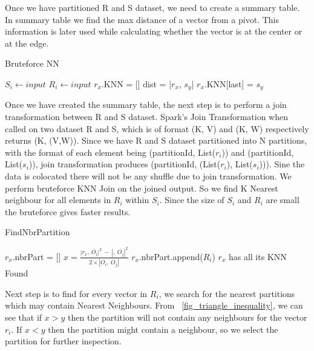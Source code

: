 Once we have partitioned R and S dataset, we need to create a summary
table. In summary table we find the max distance of a vector from a
pivot. This information is later used while calculating whether the
vector is at the center or at the edge.

\begin{algorithm}
  \caption{Bruteforce NN}
  \label{algo_bruteforce_nn}
  \begin{algorithmic}[1]
    \STATE $S_i \leftarrow input$
    \STATE $R_i \leftarrow input$
    \STATE $r_x$.KNN = []
    \STATE dist = |$r_x$, $s_y$|
    \STATE $r_x$.KNN[last] = $s_y$
    \ENDIF
    \ENDFOR
    \ENDFOR
  \end{algorithmic}
\end{algorithm}


Once we have created the summary table, the next step is to perform a join transformation between R
and S dataset. Spark's Join Transformation when called on two dataset R and S,
which is of format (K, V) and (K, W) respectively returns (K,
(V,W)). Since we have R and S dataset partitioned into N partitions,
with the format of each element being (partitionId, List($r_i$)) and
(partitionId, List($s_i$)), join transformation produces (partitionId,
(List($r_i$), List($s_i$))). Sine the data is colocated there will not
be any shuffle due to join transformation. We perform bruteforce KNN
Join on the joined output. So we find K Nearest neighbour for all
elements in $R_i$ within $S_i$. Since the size of $S_i$ and $R_i$ are
small the bruteforce gives faster results.

\begin{algorithm}
  \caption{FindNbrPartition}
  \label{algo_nbr_partition}
  \begin{algorithmic}[1]
    \STATE $r_x$.nbrPart = []
    \STATE $x = \frac{|r_x,\ O_i|^2\ -\ |,\ O_j|^2}{2 \times |O_i,\
      O_j|}$
    \STATE $r_x$.nbrPart.append($R_i$)
    \ELSE
    \STATE $r_x$ has all its KNN Found
    \ENDIF
    \ENDFOR
    \ENDFOR
    \ENDFOR
  \end{algorithmic}
\end{algorithm}



Next step is to find for every vector in $R_i$, we search for the nearest partitions
which may contain Nearest Neighbours. From ~\ref{fig_triangle_inequality}, we can see that if $x > y
$ then the partition will not contain any neighbours for the vector
$r_i$. If $x < y$ then the partition might contain a neighbour, so we
select the partition for further inspection.

